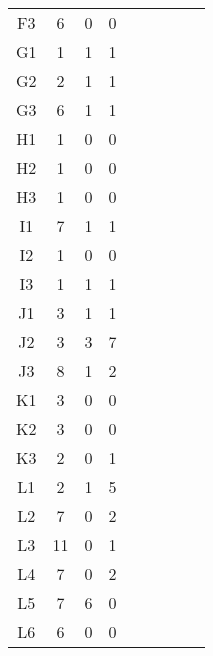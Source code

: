 \begin{center}
\begin{longtable}{ccccc|cccc}
    F3    & 6     & 0     & 0 \\
    G1    & 1     & 1     & 1 \\
    G2    & 2     & 1     & 1 \\
    G3    & 6     & 1     & 1 \\
    H1    & 1     & 0     & 0 \\
    H2    & 1     & 0     & 0 \\
    H3    & 1     & 0     & 0 \\
    I1    & 7     & 1     & 1 \\
    I2    & 1     & 0     & 0 \\
    I3    & 1     & 1     & 1 \\
    J1    & 3     & 1     & 1 \\
    J2    & 3     & 3     & 7 \\
    J3    & 8     & 1     & 2 \\
    K1    & 3     & 0     & 0 \\
    K2    & 3     & 0     & 0 \\
    K3    & 2     & 0     & 1 \\
    L1    & 2     & 1     & 5 \\
    L2    & 7     & 0     & 2 \\
    L3    & 11    & 0     & 1 \\
    L4    & 7     & 0     & 2 \\
    L5    & 7     & 6     & 0 \\
    L6    & 6     & 0     & 0 \\


\end{longtable}
\end{center}

